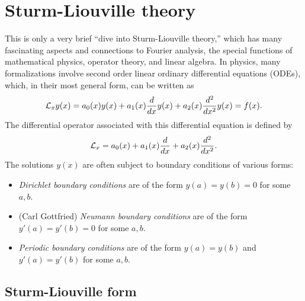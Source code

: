 \chapter{Sturm-Liouville theory}
\label{2011-m-ch-sl}

This is only a very brief ``dive into Sturm-Liouville theory,''
which has many fascinating aspects and connections to Fourier analysis, the
special functions of mathematical physics, operator theory, and linear algebra.\cite{birkhoff-Rota-48,Al-Gwaiz,everitt-handbook-sl}
In physics, many formalizations involve second order linear ordinary differential equations (ODEs),
which, in their most general form, can be written as\cite{herman-sc}
\begin{equation}
{\cal L}_x y(x) =
a_0(x) y(x)  +
a_1(x) \frac{d}{dx}y(x)+
a_2(x) \frac{d^2}{dx^2}y(x) =
f(x).
\label{2011-m-ch-sl1}
\end{equation}
The differential operator associated with this differential equation is defined by
\begin{equation}
{\cal L}_x  = a_0(x)
+
a_1(x) \frac{d}{dx}+
a_2(x) \frac{d^2}{dx^2}.
\label{2011-m-ch-sl1do}
\end{equation}
The solutions $y(x)$ are often subject to boundary conditions of various forms:
\begin{itemize}
\item
{\em Dirichlet boundary conditions}
are of the form $y(a)=y(b)=0$ for some $a,b$.


\item
(Carl Gottfried) {\em  Neumann boundary conditions}
are of the form $y'(a)=y'(b)=0$ for some $a,b$.

\item
{\em Periodic boundary conditions}
are of the form $y(a)=y(b)$ and $y'(a)=y'(b)$ for some $a,b$.
\end{itemize}

\section{Sturm-Liouville form}


